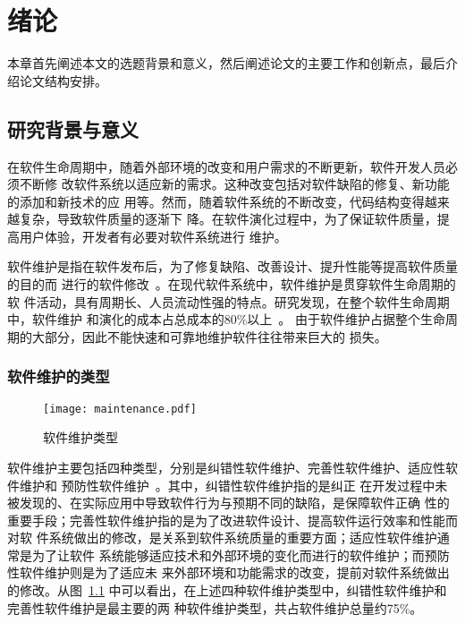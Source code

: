 
\chapter{绪论}
\label{chpt:introduction}
本章首先阐述本文的选题背景和意义，然后阐述论文的主要工作和创新点，最后介绍论文结构安排。

\section{研究背景与意义}
在软件生命周期中，随着外部环境的改变和用户需求的不断更新，软件开发人员必须不断修
改软件系统以适应新的需求。这种改变包括对软件缺陷的修复、新功能的添加和新技术的应
用等。然而，随着软件系统的不断改变，代码结构变得越来越复杂，导致软件质量的逐渐下
降。在软件演化过程中，为了保证软件质量，提高用户体验，开发者有必要对软件系统进行
维护。

软件维护是指在软件发布后，为了修复缺陷、改善设计、提升性能等提高软件质量的目的而
进行的软件修改~\cite{IEEE1219}。在现代软件系统中，软件维护是贯穿软件生命周期的软
件活动，具有周期长、人员流动性强的特点。研究发现，在整个软件生命周期中，软件维护
和演化的成本占总成本的80\%以上~\cite{guimaraes1983managing, coleman1994using}。
由于软件维护占据整个生命周期的大部分，因此不能快速和可靠地维护软件往往带来巨大的
损失。

\subsection{软件维护的类型}

\begin{figure}
  \centering
  \texttt{[image: maintenance.pdf]}  
  \caption{\label{fig:maintenance}软件维护类型}
\end{figure}

软件维护主要包括四种类型，分别是纠错性软件维护、完善性软件维护、适应性软件维护和
预防性软件维护~\cite{lientz1978characteristics}。其中，纠错性软件维护指的是纠正
在开发过程中未被发现的、在实际应用中导致软件行为与预期不同的缺陷，是保障软件正确
性的重要手段；完善性软件维护指的是为了改进软件设计、提高软件运行效率和性能而对软
件系统做出的修改，是关系到软件系统质量的重要方面；适应性软件维护通常是为了让软件
系统能够适应技术和外部环境的变化而进行的软件维护；而预防性软件维护则是为了适应未
来外部环境和功能需求的改变，提前对软件系统做出的修改。从图~\ref{fig:maintenance}
中可以看出，在上述四种软件维护类型中，纠错性软件维护和完善性软件维护是最主要的两
种软件维护类型，共占软件维护总量约75\%。

